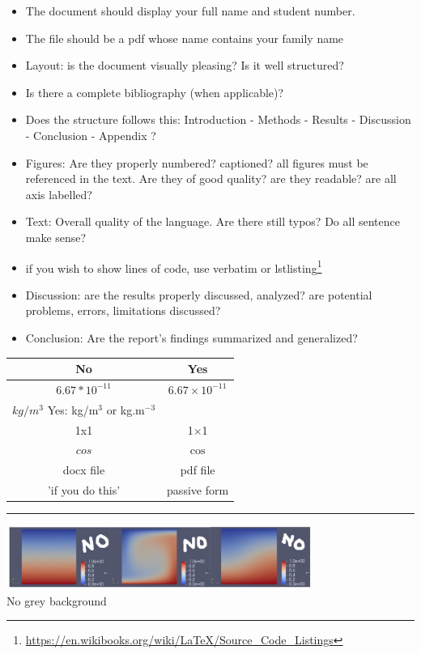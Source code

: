 





\begin{itemize}
\item 
The document should display your full name and student number. 
\item 
The file should be a pdf whose name contains your family name
\item 
Layout: is the document visually pleasing? Is it well structured? 
\item Is there a complete bibliography (when applicable)?
\item Does the structure follows this: Introduction - Methods - Results - Discussion - Conclusion - Appendix ?
\item 
Figures: Are they properly numbered? captioned? all figures must be referenced in the text. Are they of good quality? are they readable? are all axis labelled?
\item 
Text: Overall quality of the language. Are there still typos? Do all sentence make sense?
\item if you wish to show lines of code, use verbatim or lstlisting\footnote{\url{https://en.wikibooks.org/wiki/LaTeX/Source_Code_Listings}} 
\item 
Discussion: are the results properly discussed, analyzed? are potential problems, errors, limitations discussed?
\item 
Conclusion: Are the report's findings summarized and generalized?
\end{itemize}

\begin{center}
\begin{tabular}{cc}
\hline
No & Yes \\
\hline
\hline
$6.67*10^{-11}$ & $6.67 \times 10^{-11}$ \\
$kg/m^3$ Yes: kg/m$^{3}$ or kg.m$^{-3}$\\
1x1 & 1$\times$1\\
$cos$ & $\cos$\\
docx file & pdf file \\
'if you do this'& passive form \\ 
\hline
\end{tabular}
\end{center}




\par\noindent\rule{\textwidth}{0.4pt}
\begin{center}
\includegraphics[width=10cm]{images/grading/grey}\\
No grey background
\end{center}


